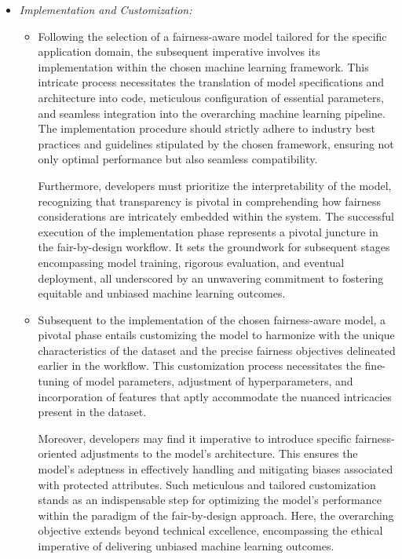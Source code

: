 \begin{itemize}
\begin{itemize}
    \end{itemize}
    
    \item \emph{Implementation and Customization:}
    
    \begin{itemize}
    
        \item Following the selection of a fairness-aware model tailored for the specific application domain, the subsequent imperative involves its implementation within the chosen machine learning framework. This intricate process necessitates the translation of model specifications and architecture into code, meticulous configuration of essential parameters, and seamless integration into the overarching machine learning pipeline. The implementation procedure should strictly adhere to industry best practices and guidelines stipulated by the chosen framework, ensuring not only optimal performance but also seamless compatibility.

        Furthermore, developers must prioritize the interpretability of the model, recognizing that transparency is pivotal in comprehending how fairness considerations are intricately embedded within the system. The successful execution of the implementation phase represents a pivotal juncture in the fair-by-design workflow. It sets the groundwork for subsequent stages encompassing model training, rigorous evaluation, and eventual deployment, all underscored by an unwavering commitment to fostering equitable and unbiased machine learning outcomes.    
    
        \item Subsequent to the implementation of the chosen fairness-aware model, a pivotal phase entails customizing the model to harmonize with the unique characteristics of the dataset and the precise fairness objectives delineated earlier in the workflow. This customization process necessitates the fine-tuning of model parameters, adjustment of hyperparameters, and incorporation of features that aptly accommodate the nuanced intricacies present in the dataset.

        Moreover, developers may find it imperative to introduce specific fairness-oriented adjustments to the model's architecture. This ensures the model's adeptness in effectively handling and mitigating biases associated with protected attributes. Such meticulous and tailored customization stands as an indispensable step for optimizing the model's performance within the paradigm of the fair-by-design approach. Here, the overarching objective extends beyond technical excellence, encompassing the ethical imperative of delivering unbiased machine learning outcomes.    
    
    \end{itemize}

\end{itemize}

